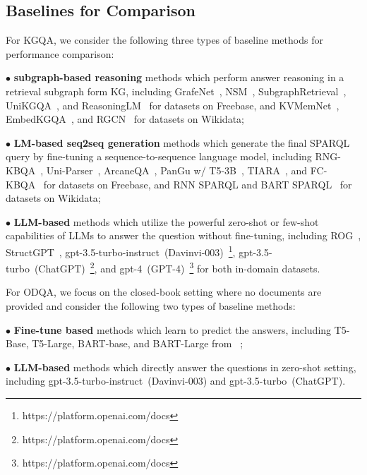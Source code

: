 \subsection{Baselines for Comparison} 
For KGQA, we consider the following three types of baseline methods for performance comparison:

$\bullet$ \textbf{subgraph-based reasoning} methods which perform answer reasoning in a retrieval subgraph form KG, including GrafeNet~\cite{GraftNet}, NSM~\cite{NSM}, SubgraphRetrieval~\cite{Zhang-ACL-22}, UniKGQA~\cite{jiang-arxiv-22}, and ReasoningLM~\cite{ReasoningLM} for datasets on Freebase, and KVMemNet~\cite{miller-EMNLP-16}, EmbedKGQA~\cite{Saxena-ACL-20}, and RGCN~\cite{RGCN} for datasets on Wikidata;

$\bullet$ \textbf{LM-based seq2seq generation} methods which generate the final SPARQL query by fine-tuning a sequence-to-sequence language model, including RNG-KBQA~\cite{RNG-KBQA}, Uni-Parser~\cite{UniParser}, ArcaneQA~\cite{ArcaneQA}, PanGu w/ T5-3B~\cite{Gu-ACL-23}, TIARA~\cite{TIARA}, and FC-KBQA~\cite{FC-KBQA} for datasets on Freebase, and RNN SPARQL and BART SPARQL~\cite{KQA-Pro} for datasets on Wikidata;

$\bullet$ \textbf{LLM-based} methods which utilize the powerful zero-shot or few-shot capabilities of LLMs to answer the question without fine-tuning, including ROG~\cite{Luo-arxiv-23-Reasoning}, StructGPT~\cite{Jiang-2023-arxiv-StructGPT}, gpt-3.5-turbo-instruct~(Davinvi-003)~\footnote{https://platform.openai.com/docs}, gpt-3.5-turbo~(ChatGPT)~\footnote{https://platform.openai.com/docs}, and gpt-4~(GPT-4)~\footnote{https://platform.openai.com/docs} for both in-domain datasets.

For ODQA, we focus on the closed-book setting where no documents are provided and consider the following two types of baseline methods:

$\bullet$ \textbf{Fine-tune based} methods which learn to predict the answers, including T5-Base, T5-Large, BART-base, and BART-Large from ~\citep{pack-knowledge};

$\bullet$ \textbf{LLM-based} methods which directly answer the questions in zero-shot setting, including gpt-3.5-turbo-instruct~(Davinvi-003) and gpt-3.5-turbo~(ChatGPT).

